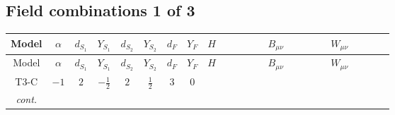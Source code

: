 \documentclass[8pt]{article}
\begin{document}
\begin{landscape}
\subsection*{Field combinations 1 of 3}
\begin{longtable}{@{}cccccccc >{\raggedright\arraybackslash}p{0.21\linewidth} >{\raggedright\arraybackslash}p{0.21\linewidth} >{\raggedright\arraybackslash}p{0.21\linewidth}@{}}
\toprule
Model & $\alpha$ & $d_{S_1}$ & $Y_{S_1}$ & $d_{S_2}$ & $Y_{S_2}$ & $d_F$ & $Y_F$ & $H$ & $B_{\mu\nu}$ & $W_{\mu\nu}$ \\
\midrule
\endfirsthead
\toprule
Model & $\alpha$ & $d_{S_1}$ & $Y_{S_1}$ & $d_{S_2}$ & $Y_{S_2}$ & $d_F$ & $Y_F$ & $H$ & $B_{\mu\nu}$ & $W_{\mu\nu}$ \\
\midrule
\endhead
T3-C & $-1$ & $2$ & $-\frac{1}{2}$ & $2$ & $\frac{1}{2}$ & $3$ & $0$ & \scriptsize\adjustbox{max width=\linewidth}{$\begin{gathered} +C_{\text{H2}} H_{a_1} H_{a_1}{}^{\dagger } \\ -H_{a_1} \mu ^2 H_{a_1}{}^{\dagger } \\ +\frac{4 \hbar  \overline{\lambda_5} H_{a_1} H_{a_2} \lambda_5 H_{a_1}{}^{\dagger } H_{a_2}{}^{\dagger }}{3 \epsilon }\end{gathered}$} & \scriptsize\adjustbox{max width=\linewidth}{$\begin{gathered} -\frac{\hbar  B_{\mu _1\mu _2}^2}{12 \epsilon } \\ -\frac{1}{24} \hbar  \log \left(\frac{\bar{\mu}^{2}}{m_1^2}\right) B_{\mu _1\mu _2}^2 \\ -\frac{1}{24} \hbar  \log \left(\frac{\bar{\mu}^{2}}{m_2^2}\right) B_{\mu _1\mu _2}^2\end{gathered}$} & \scriptsize\adjustbox{max width=\linewidth}{$\begin{gathered} -\frac{13 \hbar  \left(W_{\mu _1\mu _2}^{A_1}\right){}^2}{12 \epsilon } \\ -\frac{1}{24} \hbar  \log \left(\frac{\bar{\mu}^{2}}{m_1^2}\right) \left(W_{\mu _1\mu _2}^{A_1}\right){}^2 \\ -\frac{1}{24} \hbar  \log \left(\frac{\bar{\mu}^{2}}{m_2^2}\right) \left(W_{\mu _1\mu _2}^{A_1}\right){}^2\end{gathered}$} \\
\textit{cont.} &  &  &  &  &  &  &  & \scriptsize\adjustbox{max width=\linewidth}{$\begin{gathered} +\frac{4 \hbar  \overline{\lambda_5} H_{a_1} H_{a_2} m_1^2 \lambda_5 H_{a_1}{}^{\dagger } H_{a_2}{}^{\dagger }}{3 \left(m_1^2-m_2^2\right)} \\ +\frac{4 \hbar  \log \left(\frac{\bar{\mu}^{2}}{m_1^2}\right) \overline{\lambda_5} H_{a_1} H_{a_2} m_1^2 \lambda_5 H_{a_1}{}^{\dagger } H_{a_2}{}^{\dagger }}{3 \left(m_1^2-m_2^2\right)} \\ -\frac{4 \hbar  \overline{\lambda_5} H_{a_1} H_{a_2} m_2^2 \lambda_5 H_{a_1}{}^{\dagger } H_{a_2}{}^{\dagger }}{3 \left(m_1^2-m_2^2\right)}\end{gathered}$} &  &  \\

\end{longtable}
\end{landscape}
\end{document}
